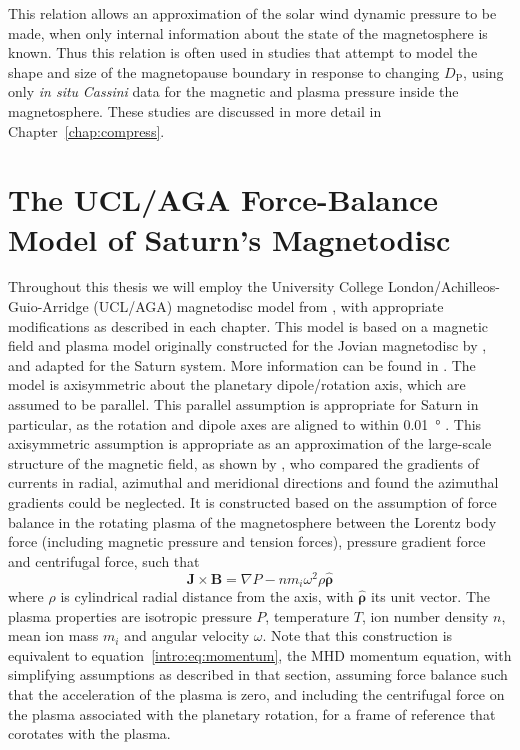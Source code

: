 This relation allows an approximation of the solar wind dynamic pressure to be made, when only internal information about the state of the magnetosphere is known. Thus this relation is often used in studies that attempt to model the shape and size of the magnetopause boundary in response to changing $D_\mathrm{P}$, using only \textit{in situ} \textit{Cassini} data for the magnetic and plasma pressure inside the magnetosphere. These studies are discussed in more detail in Chapter~\ref{chap:compress}.

\section{The UCL/AGA Force-Balance Model of Saturn's Magnetodisc}\label{intro:sec:forcebalancemodel}
Throughout this thesis we will employ the University College London/Achilleos-Guio-Arridge (UCL/AGA) magnetodisc model from \citet{achilleos2010a,achilleos2010b}, with appropriate modifications as described in each chapter. This model is based on a magnetic field and plasma model originally constructed for the Jovian magnetodisc by \citet{caudal1986}, and adapted for the Saturn system. More information can be found in \citet{achilleos2010a, achilleos2010b}. The model is axisymmetric about the planetary dipole/rotation axis, which are assumed to be parallel. This parallel assumption is appropriate for Saturn in particular, as the rotation and dipole axes are aligned to within \SI{0.01}{\degree} \citep{dougherty2018}. This axisymmetric assumption is appropriate as an approximation of the large-scale structure of the magnetic field, as shown by \citet{hunt2014}, who compared the gradients of currents in radial, azimuthal and meridional directions and found the azimuthal gradients could be neglected. It is constructed based on the assumption of force balance in the rotating plasma of the magnetosphere between the Lorentz body force (including magnetic pressure and tension forces), pressure gradient force and centrifugal force, such that 
\begin{equation}\label{intro:eq:forcebalance}
\boldsymbol{J} \times \boldsymbol{B} = \nabla P - nm_i\omega^2\rho\boldsymbol{\hat{\rho}}
\end{equation}
where $\rho$ is cylindrical radial distance from the axis, with $\boldsymbol{\hat{\rho}}$ its unit vector. The plasma properties are isotropic pressure $P$, temperature $T$, ion number density $n$, mean ion mass $m_i$ and angular velocity $\omega$. Note that this construction is equivalent to equation~\ref{intro:eq:momentum}, the MHD momentum equation, with simplifying assumptions as described in that section, assuming force balance such that the acceleration of the plasma is zero, and including the centrifugal force on the plasma associated with the planetary rotation, for a frame of reference that corotates with the plasma.

